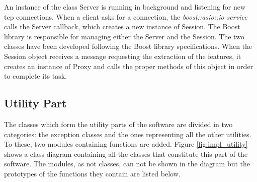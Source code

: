 		An instance of the class Server is running in background and listening for new tcp connections. 
		When a client asks for a connection, the \emph{boost::asio::io service} calls the Server callback, which creates a new instance of Session.
		The Boost library is responsible for managing either the Server and the Session.
		The two classes have been developed following the Boost library specifications.
		When the Session object receives a message requesting the extraction of the features, it creates an instance of Proxy and calls the proper methods of this object in order to complete its task.

		\newpage

		\subsection{Utility Part}
		The classes which form the utility parts of the software are divided in two categories: the exception classes and the ones representing all the other utilities. 
		To these, two modules containing functions are added. 
		Figure \ref{fig:impl_utility} shows a class diagram containing all the classes that constitute this part of the software. 
		The modules, as not classes, can not be shown in the diagram but the prototypes of the functions they contain are listed below.
